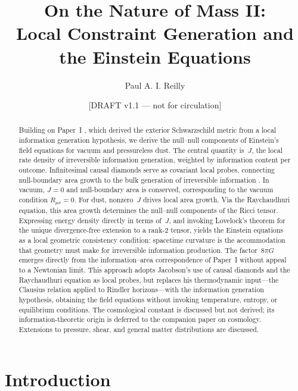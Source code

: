 \documentclass[12pt]{article}
\title{On the Nature of Mass II:\\
Local Constraint Generation and the Einstein Equations}
\author{Paul A. I. Reilly}
\date{[DRAFT v1.1 --- not for circulation]}
\begin{document}
\maketitle

\begin{abstract}

Building on Paper~I \cite{Reilly2026}, which derived the exterior
Schwarzschild metric from a local information generation hypothesis,
we derive the null--null components of Einstein's field equations
for vacuum and pressureless dust.
The central quantity is~$J$, the local rate density of irreversible
information generation, weighted by information content per outcome.
Infinitesimal causal diamonds serve as covariant local probes,
connecting null-boundary area growth to the bulk generation of
irreversible information \cite{Jacobson1995,Wald1984}.
In vacuum, $J=0$ and null-boundary area is conserved,
corresponding to the vacuum condition $R_{\mu\nu}=0$.
For dust, nonzero~$J$ drives local area growth.
Via the Raychaudhuri equation, this area growth determines
the null--null components of the Ricci tensor.
Expressing energy density directly in terms of~$J$,
and invoking Lovelock's theorem \cite{Lovelock1971} for the
unique divergence-free extension to a rank-2 tensor, yields
the Einstein equations as a local geometric consistency
condition: spacetime curvature is the accommodation that
geometry must make for irreversible information production.
The factor~$8\pi G$ emerges directly from the information--area
correspondence of Paper~I without appeal to a Newtonian limit.
This approach adopts Jacobson's \cite{Jacobson1995} use of
causal diamonds and the Raychaudhuri equation as local probes,
but replaces his thermodynamic input---the Clausius relation
applied to Rindler horizons---with the information generation
hypothesis, obtaining the field equations without invoking
temperature, entropy, or equilibrium conditions.
The cosmological constant is discussed but not derived;
its information-theoretic origin is deferred to the
companion paper on cosmology.
Extensions to pressure, shear, and general matter distributions
are discussed.

\end{abstract}

\section{Introduction}
\end{document}
